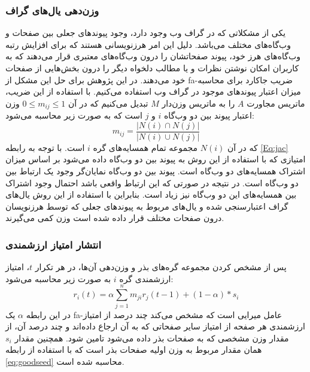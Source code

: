 \documentclass[twoside, a4paper,11pt]{book}
\numberwithin{equation}{chapter}
\numberwithin{table}{chapter}
\numberwithin{figure}{chapter}
\numberwithin{equation}{chapter}
\newcommand{\mls}[1]{\gls{fa-#1}\glsuseri{la-#1}}
\begin{document}
\subsubsection{وزن‌دهی یال‌های گراف}
\label{section:linkbased-wp-linkweight}
یکی از مشکلاتی که در گراف‌ وب وجود دارد، وجود پیوندهای جعلی بین صفحات و وب‌گاه‌های مختلف می‌باشد. دلیل این امر هرزنویسانی هستند که برای افزایش رتبه وب‌گاه‌های هرز خود، پیوند صفحاتشان را درون وب‌گاه‌های معتبری قرار می‌دهند که به کاربران امکان نوشتن نظرات و یا مطالب دلخواه دیگر را درون بخش‌هایی از صفحات خود می‌دهند. در این پژوهش برای حل این مشکل از \mls{ضریب جاکارد} برای محاسبه میزان اعتبار پیوندهای موجود در گراف وب استفاده می‌کنیم. با استفاده از این ضریب، ماتریس مجاورت $A$ را به ماتریس وزن‌دار $M$ تبدیل می‌کنیم که در آن $0 \leq m_{ij} \leq 1$ وزن اعتبار پیوند بین دو وب‌گاه $i$ و $j$ است که به صورت زیر محاسبه می‌شود:
 \begin{equation}
	m_{ij} = \frac{|N(i)\cap N(j)|}{|N(i)\cup N(j)|}
	\label{Eq:jac}
\end{equation}
که در آن $N(i)$ مجموعه تمام همسایه‌های گره $i$ است. با توجه به رابطه \ref{Eq:jac} امتیازی که با استفاده از این روش به پیوند بین دو وب‌گاه داده می‌شود بر اساس میزان اشتراک همسایه‌های دو وب‌گاه است. پیوند بین دو وب‌گاه نمایان‌گر وجود یک ارتباط بین دو وب‌گاه است. در نتیجه در صورتی که این ارتباط واقعی باشد احتمال وجود اشتراک بین همسایه‌های این دو وب‌گاه نیز زیاد است. بنابراین با استفاده از این روش یال‌های گراف اعتبارسنجی شده و یال‌های مربوط به پیوندهای جعلی که توسط هرزنویسان درون صفحات مختلف قرار داده شده است وزن کمی می‌گیرند. 


\subsubsection{انتشار امتیاز ارزشمندی}
\label{section:linkbased-wp-wpropagation}
پس از مشخص کردن مجموعه گره‌های بذر و وزن‌دهی آن‌ها، در هر تکرار $t$، امتیاز ارزشمندی گره $i$ به صورت زیر محاسبه می‌شود:
 \begin{equation}
	r_{i}(t) = \alpha \sum\limits_{j=1}^n m_{ji} r_{j}(t-1) + (1-{\alpha}) * s_i
	\label{Eq:worthprop}
\end{equation}
در این رابطه $\alpha$ یک \mls{عامل میرایی} است که مشخص می‌کند چند درصد از امتیاز ارزشمندی هر صفحه از امتیاز سایر صفحاتی که به آن ارجاع داده‌اند و چند درصد آن، از مقدار وزن مشخصی که به صفحات بذر داده می‌شود تامین شود. همچنین مقدار $s_i$ همان مقدار مربوط به وزن اولیه صفحات بذر است که با استفاده از رابطه \ref{eq:goodseed}  محاسبه شده است.
 
\end{document}
